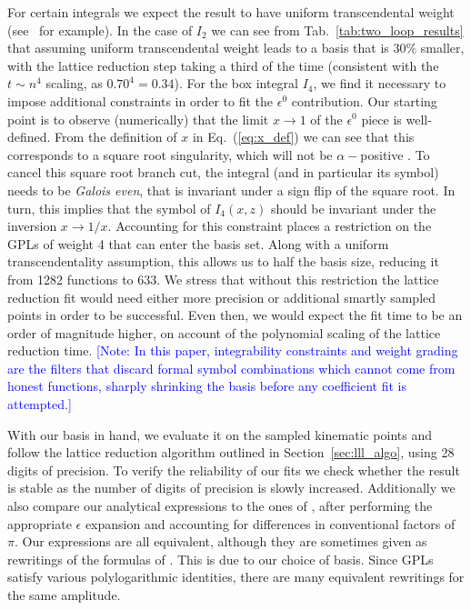 \documentclass[a4paper,11pt]{article}
\makeatletter
\def\textcolor#1#{\kg@textcolor{#1}}
\makeatother
\begin{document}
For certain integrals we expect the result to have uniform transcendental weight (see~\cite{Arkani-Hamed:2010pyv} for example). In the case of $I_2$ we can see  from Tab.~\ref{tab:two_loop_results} that assuming uniform transcendental weight leads to a basis that is $30\%$ smaller, with the lattice reduction step taking a third of the time (consistent with the $t\sim n^4$ scaling, as $0.70^4=0.34$). For the box integral $I_4$, we find it necessary to impose additional constraints in order to fit the $\epsilon^0$ contribution. Our starting point is to observe (numerically) that the limit $x\rightarrow 1$ of the $\epsilon^0$ piece is well-defined. From the definition of $x$ in Eq.~(\ref{eq:x_def}) we can see that this corresponds to a square root singularity, which will not be $\alpha-$positive \cite{Hannesdottir:2024hke}. To cancel this square root branch cut, the integral (and in particular its symbol) needs to be \textit{Galois even}, that is invariant under a sign flip of the square root. In turn, this implies that the symbol of $I_4(x,z)$  should be invariant under the inversion $x\rightarrow 1/x$. Accounting for this constraint places a restriction on the GPLs of weight 4 that can enter the basis set. Along with a uniform transcendentality assumption, this allows us to half the basis size, reducing it from 1282 functions to 633. We stress that without this restriction the lattice reduction fit would need either more precision or additional smartly sampled points in order to be successful. Even then, we would expect the fit time to be an order of magnitude higher, on account of the polynomial scaling of the lattice reduction time.
\textcolor{blue}{\small [Note: In this paper, integrability constraints and weight grading are the filters that discard formal symbol combinations which cannot come from honest functions, sharply shrinking the basis before any coefficient fit is attempted.]}



With our basis in hand, we evaluate it on the sampled kinematic points and follow the lattice reduction algorithm outlined in Section~\ref{sec:lll_algo}, using 28 digits of precision. To verify the reliability of our fits we check whether the result is stable as the number of digits of precision is slowly increased. Additionally we also compare our analytical expressions to the ones of \cite{Gehrmann:2013cxs}, after performing the appropriate $\epsilon$ expansion and accounting for differences in conventional factors of $\pi$. Our expressions are all equivalent, although they are sometimes given as rewritings of the formulas of \cite{Gehrmann:2013cxs}. This is due to our choice of basis. Since GPLs satisfy various polylogarithmic identities, there are many equivalent rewritings for the same amplitude. 
\end{document}
